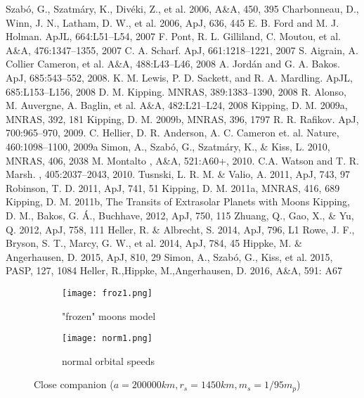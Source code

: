\documentclass[12pt]{article}
\begin{document}
\begin{thebibliography}{}
 Szabó, G., Szatmáry, K., Divéki, Z.,  et al. 2006, A\&A, 450, 395
 Charbonneau, D., Winn, J. N., Latham, D. W., et al. 2006, ApJ, 636, 445
  E. B. Ford and M. J. Holman. ApJL, 664:L51–L54, 2007
  F. Pont, R. L. Gilliland, C. Moutou, et al.  A\&A, 476:1347–1355, 2007 
  C. A. Scharf.  ApJ, 661:1218–1221, 2007 
 S. Aigrain, A. Collier Cameron, et al. A\&A, 488:L43–L46, 2008
 A. Jord\'an and G. A. Bakos. ApJ, 685:543–552, 2008.
 K. M. Lewis, P. D. Sackett, and R. A. Mardling.  ApJL, 685:L153–L156, 2008
 D. M. Kipping. MNRAS, 389:1383–1390, 2008
 R. Alonso, M. Auvergne, A. Baglin, et al.  A\&A, 482:L21–L24, 2008
 Kipping, D. M. 2009a, MNRAS, 392, 181
 Kipping, D. M. 2009b, MNRAS, 396, 1797
 R. R. Rafikov. ApJ, 700:965–970, 2009. 
 C. Hellier, D. R. Anderson, A. C. Cameron et. al. Nature, 460:1098–1100, 2009a 
 Simon, A., Szabó, G., Szatmáry, K., \& Kiss, L. 2010, MNRAS, 406, 2038
 M. Montalto ,  A\&A, 521:A60+, 2010.
 C.A. Watson and T. R. Marsh. , 405:2037–2043, 2010. 
 Tusnski, L. R. M. \& Valio, A. 2011, ApJ, 743, 97
 Robinson, T. D. 2011, ApJ, 741, 51 
 Kipping, D. M. 2011a, MNRAS, 416, 689
 Kipping, D. M. 2011b, The Transits of Extrasolar Planets with Moons
 Kipping, D. M., Bakos, G. Á., Buchhave,  2012, ApJ, 750, 115
 Zhuang, Q., Gao, X., \& Yu, Q. 2012, ApJ, 758, 111
 Heller, R. \& Albrecht, S. 2014, ApJ, 796, L1 
 Rowe, J. F., Bryson, S. T., Marcy, G. W., et al. 2014, ApJ, 784, 45
 Hippke, M. \& Angerhausen, D. 2015, ApJ, 810, 29
  Simon, A., Szabó, G., Kiss, et al. 2015, PASP, 127, 1084
 Heller, R.,Hippke, M.,Angerhausen, D. 2016, A\&A, 591: A67


\end{thebibliography}
 
\begin{figure}[h]

\begin{subfigure}{0.5\textwidth}
\texttt{[image: froz1.png]} 
\caption{"frozen" moons model}
\label{fig:3}
\end{subfigure}
\begin{subfigure}{0.5\textwidth}
\texttt{[image: norm1.png]}
\caption{normal orbital speeds}
\label{fig:subim2}
\end{subfigure}
\caption{Close companion
($a =200000 km, r_s =1450 km, m_s=1/95 m_p$)}
\label{fig:image2}
\end{figure}
\end{document}
